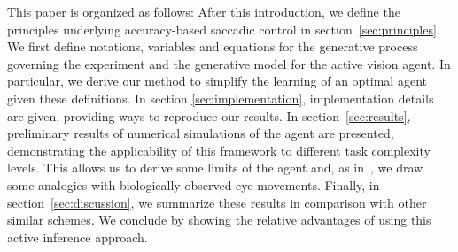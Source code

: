 This paper is organized as follows: After this introduction, we define the principles underlying accuracy-based saccadic control in section~\ref{sec:principles}. We first define notations, variables and equations for the generative process governing the experiment and the generative model for the active vision agent. In particular, we derive our method to simplify the learning of an optimal agent given these definitions. In section \ref{sec:implementation}, implementation details are given, providing ways to reproduce our results. In section~\ref{sec:results}, preliminary results of numerical simulations of the agent are presented, demonstrating the applicability of this framework to different task complexity levels. This allows us to derive some limits of the agent and, as in~\citep{Najemnik05}, we draw some analogies with biologically observed eye movements. Finally, in section~\ref{sec:discussion}, we summarize these results in comparison with other similar schemes. We conclude by showing the relative advantages of using this active inference approach.
